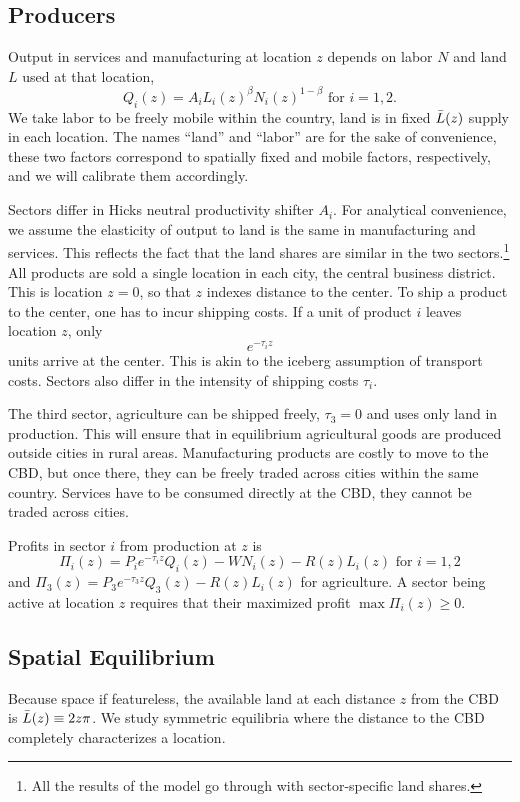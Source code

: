 \documentclass[12pt]{article}
\begin{document}
\subsection{Producers}
Output in services and manufacturing at location $z$ depends on labor $N$ and land $L$ used at that location,
\[
Q_i(z) = A_i L_i(z)^{\beta}N_i(z)^{1-\beta}\text{ for }i=1,2.
\]
We take labor to be freely mobile within the country, land is in fixed $\Bar{L}(z)$ supply in each location. The names ``land'' and ``labor'' are for the sake of convenience, these two factors correspond to spatially fixed and mobile factors, respectively, and we will calibrate them accordingly.

Sectors differ in Hicks neutral productivity shifter $A_i$. For analytical convenience, we assume the elasticity of output to land is the same in manufacturing and services. This reflects the fact that the land shares are similar in the two sectors.\footnote{All the results of the model go through with sector-specific land shares.}
All products are sold a single location in each city, the central business district. This is location $z=0$, so that $z$ indexes distance to the center.
To ship a product to the center, one has to incur shipping costs. If a unit of product $i$ leaves location $z$, only
\[
e^{-\tau_i z}
\]
units arrive at the center. This is akin to the iceberg assumption of transport costs. Sectors also differ in the intensity of shipping costs $\tau_i$. 

The third sector, agriculture can be shipped freely, $\tau_3=0$ and uses only land in production. This will ensure that in equilibrium agricultural goods are produced outside cities in rural areas. Manufacturing products are costly to move to the CBD, but once there, they can be freely traded across cities within the same country. Services have to be consumed directly at the CBD, they cannot be traded across cities.

Profits in sector $i$ from production at $z$ is
\begin{equation}
\label{eq:profit}
\Pi_i(z)=P_ie^{-\tau_iz}Q_i(z)-WN_i(z)-R(z)L_i(z)\text{ for }i=1,2
\end{equation}
and $\Pi_3(z)=P_3e^{-\tau_3z}Q_3(z)-R(z)L_i(z)$ for agriculture. A sector being active at location $z$ requires that their maximized profit $\max\Pi_i(z)\geq0.$

\subsection{Spatial Equilibrium}
Because space if featureless, the available land at each distance $z$ from the CBD is $\Bar L(z) \equiv 2z\pi$. We study symmetric equilibria where the distance to the CBD completely characterizes a location.
\end{document}
